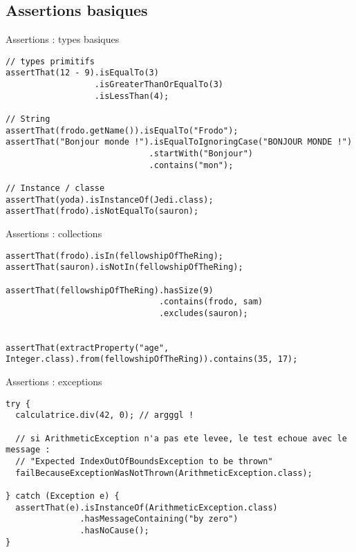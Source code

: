 \documentclass[compress]{beamer}%
\begin{document}
\subsection{Assertions basiques}

\begin{frame}[containsverbatim]{Assertions : types basiques}
	
	\begin{lstlisting}
// types primitifs
assertThat(12 - 9).isEqualTo(3)
                  .isGreaterThanOrEqualTo(3)
                  .isLessThan(4);

// String
assertThat(frodo.getName()).isEqualTo("Frodo");
assertThat("Bonjour monde !").isEqualToIgnoringCase("BONJOUR MONDE !")
                             .startWith("Bonjour")
                             .contains("mon");

// Instance / classe
assertThat(yoda).isInstanceOf(Jedi.class);
assertThat(frodo).isNotEqualTo(sauron);
	\end{lstlisting}
\end{frame}


\begin{frame}[containsverbatim]{Assertions : collections}
	
	\begin{lstlisting}
assertThat(frodo).isIn(fellowshipOfTheRing);
assertThat(sauron).isNotIn(fellowshipOfTheRing);

assertThat(fellowshipOfTheRing).hasSize(9)
                               .contains(frodo, sam)
                               .excludes(sauron);
                               

assertThat(extractProperty("age", Integer.class).from(fellowshipOfTheRing)).contains(35, 17);
	\end{lstlisting}
\end{frame}


\begin{frame}[containsverbatim]{Assertions : exceptions}
	
	\begin{lstlisting}
try {
  calculatrice.div(42, 0); // argggl !
  
  // si ArithmeticException n'a pas ete levee, le test echoue avec le message : 
  // "Expected IndexOutOfBoundsException to be thrown"
  failBecauseExceptionWasNotThrown(ArithmeticException.class);
  
} catch (Exception e) {
  assertThat(e).isInstanceOf(ArithmeticException.class)
               .hasMessageContaining("by zero")
               .hasNoCause();
}
	\end{lstlisting}
\end{frame}
\end{document}
